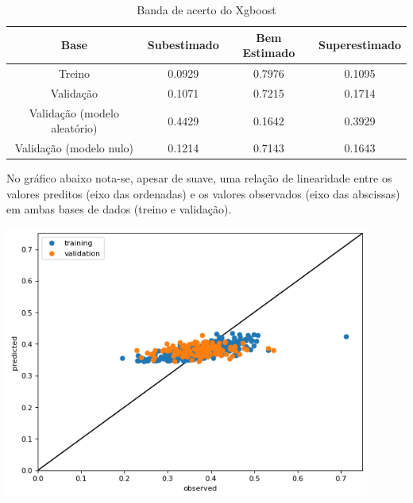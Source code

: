 \begin{table}[h]
\centering
\caption{Banda de acerto do Xgboost}
\label{tab:cap3_band_xgboost}
\begin{tabular}{cccc}
Base & Subestimado & Bem Estimado & Superestimado \\
\hline
Treino & 0.0929 & 0.7976 & 0.1095 \\
Validação & 0.1071 & 0.7215 & 0.1714 \\
Validação (modelo aleatório) & 0.4429 & 0.1642 & 0.3929 \\
Validação (modelo nulo) & 0.1214 & 0.7143 & 0.1643 \\
\hline
\end{tabular}
\end{table}

No gráfico abaixo nota-se, apesar de suave, uma relação de linearidade entre os valores preditos (eixo das ordenadas) e os valores observados (eixo das abscissas) em ambas bases de dados (treino e validação).

\graphicspath{ {./figuras/model_performance/} }
\begin{center}
\includegraphics[width=12.0cm, keepaspectratio]{cap3_scatter_xgboost}
\label{ape:cap3_scatter_xgboost}
\end{center}

